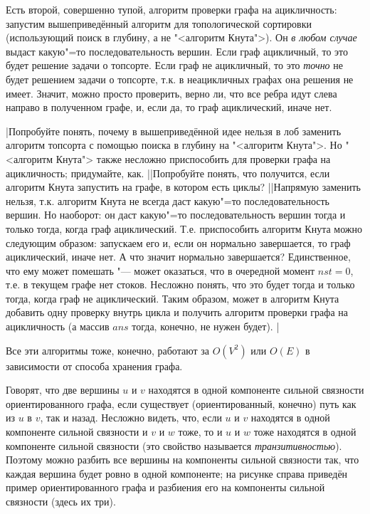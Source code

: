 Есть второй, совершенно тупой, алгоритм проверки графа на ацикличность: запустим 
вышеприведённый алгоритм для топологической сортировки (использующий поиск в глубину, а не 
"<алгоритм Кнута">). Он \textit{в любом случае} выдаст какую"=то последовательность вершин. Если 
граф ацикличный, то это будет решение задачи о топсорте. Если граф не ацикличный, то это 
\textit{точно} не будет решением задачи о топсорте, т.к. в неацикличных графах она решения не 
имеет. Значит, можно просто проверить, верно ли, что все ребра идут слева направо в полученном 
графе, и, если да, то граф ациклический, иначе нет.

\task|Попробуйте понять, почему в вышеприведённой идее нельзя в лоб заменить алгоритм топсорта с 
помощью поиска в глубину на "<алгоритм Кнута">. Но "<алгоритм Кнута"> также несложно приспособить 
для проверки графа на ацикличность; придумайте, как.
||Попробуйте понять, что получится, если алгоритм Кнута запустить 
на графе, в котором есть циклы?
||Напрямую заменить нельзя, т.к. алгоритм Кнута не всегда даст какую"=то последовательность
вершин. Но наоборот: он даст какую"=то последовательность вершин тогда и только тогда, когда граф ациклический.
Т.е. приспособить алгоритм Кнута можно следующим образом: запускаем его и, если он нормально завершается, то
граф ациклический, иначе нет. А что значит нормально завершается? Единственное, что ему может помешать "---
может оказаться, что в очередной момент $nst=0$, т.е. в текущем графе нет стоков. Несложно понять, что это
будет тогда и только тогда, когда граф не ациклический. Таким образом, может в алгоритм Кнута добавить одну проверку
внутрь цикла и получить алгоритм проверки графа на ацикличность (а массив $ans$ тогда, конечно, не нужен будет).
|\label{Knuthforacycliccheck}

Все эти алгоритмы тоже, конечно, работают за $O(V^2)$ или $O(E)$ в зависимости от способа хранения 
графа.

Говорят, что две вершины $u$ и $v$ находятся в одной компоненте сильной связности ориентированного графа, 
если существует (ориентированный, конечно) путь как из $u$ в $v$, так и назад. Несложно видеть, что, если $u$ и $v$ 
находятся в одной компоненте сильной связности и $v$ и $w$ тоже, то и $u$ и $w$ тоже находятся в одной компоненте 
сильной связности (это свойство называется \textit{транзитивностью}). Поэтому можно разбить все
вершины на компоненты сильной связности так, что каждая вершина будет ровно в одной компоненте; на
рисунке справа приведён пример ориентированного графа и разбиения его на компоненты сильной
связности (здесь их три).


